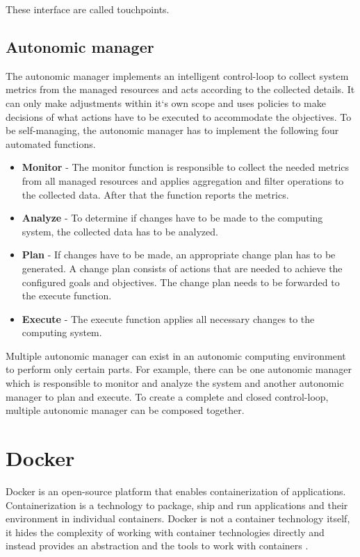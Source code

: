 These interface are called touchpoints.

\subsection{Autonomic manager}
The autonomic manager implements an intelligent control-loop to collect system metrics from the managed resources and acts according to the collected details. It can only make adjustments within it`s own scope and uses policies to make decisions of what actions have to be
executed to accommodate the objectives.
To be self-managing, the autonomic manager has to implement the following four automated functions.

\begin{itemize}
\item \textbf{Monitor}
- The monitor function is responsible to collect the needed metrics from all managed resources and applies aggregation and filter
operations to the collected data. After that the function reports the metrics.

\item \textbf{Analyze}
- To determine if changes have to be made to the computing system, the collected data has to be analyzed.

\item \textbf{Plan}
- If changes have to be made, an appropriate change plan has to be generated. A change plan consists of actions that are needed to achieve the configured goals and objectives. The change plan needs to be forwarded to the execute function.

\item \textbf{Execute}
- The execute function applies all necessary changes to the computing system.

\end{itemize}

Multiple autonomic manager can exist in an autonomic computing environment to perform only certain parts. For example, 
there can be one autonomic manager which is responsible to monitor and analyze the system and another autonomic manager 
to plan and execute. To create a complete and closed control-loop, multiple autonomic manager can be composed together.


\section{Docker}
Docker is an open-source platform that enables containerization of applications. Containerization is a technology to package, ship and run applications and their environment in individual containers.
Docker is not a container technology itself, it hides the complexity of working with container technologies directly and instead provides an abstraction and the tools to work with containers \cite{Nickoloff2019Docker, Bullington2020Docker, Potdar2020Docker}.


